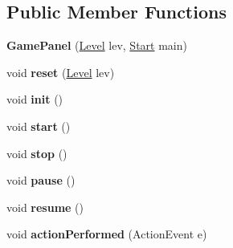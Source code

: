 \subsection*{Public Member Functions}
\begin{DoxyCompactItemize}
\item 
\hypertarget{classbrick_breaker_1_1_game_panel_a9babd944824d2c3462b8dbdc099d65b4}{
{\bfseries GamePanel} (\hyperlink{classbrick_breaker_1_1_level}{Level} lev, \hyperlink{classbrick_breaker_1_1_start}{Start} main)}
\label{classbrick_breaker_1_1_game_panel_a9babd944824d2c3462b8dbdc099d65b4}

\item 
\hypertarget{classbrick_breaker_1_1_game_panel_a55dcdeddbe45e2a0d1b4e3ac792aefc4}{
void {\bfseries reset} (\hyperlink{classbrick_breaker_1_1_level}{Level} lev)}
\label{classbrick_breaker_1_1_game_panel_a55dcdeddbe45e2a0d1b4e3ac792aefc4}

\item 
\hypertarget{classbrick_breaker_1_1_game_panel_a65a1fcc7b053868c7ee654c10036c4a0}{
void {\bfseries init} ()}
\label{classbrick_breaker_1_1_game_panel_a65a1fcc7b053868c7ee654c10036c4a0}

\item 
\hypertarget{classbrick_breaker_1_1_game_panel_ac06637c2b612d44711aebefde82249bc}{
void {\bfseries start} ()}
\label{classbrick_breaker_1_1_game_panel_ac06637c2b612d44711aebefde82249bc}

\item 
\hypertarget{classbrick_breaker_1_1_game_panel_adda952b668cd479832134a4c0ddfbc41}{
void {\bfseries stop} ()}
\label{classbrick_breaker_1_1_game_panel_adda952b668cd479832134a4c0ddfbc41}

\item 
\hypertarget{classbrick_breaker_1_1_game_panel_a74382da15296d8ed9be081e4e6af72cc}{
void {\bfseries pause} ()}
\label{classbrick_breaker_1_1_game_panel_a74382da15296d8ed9be081e4e6af72cc}

\item 
\hypertarget{classbrick_breaker_1_1_game_panel_af987d9ffe6d1d68941a93547bab41cfe}{
void {\bfseries resume} ()}
\label{classbrick_breaker_1_1_game_panel_af987d9ffe6d1d68941a93547bab41cfe}

\item 
\hypertarget{classbrick_breaker_1_1_game_panel_a9ede756878b9f1056369baa900dcbc4f}{
void {\bfseries actionPerformed} (ActionEvent e)}
\label{classbrick_breaker_1_1_game_panel_a9ede756878b9f1056369baa900dcbc4f}


\end{DoxyCompactItemize}
